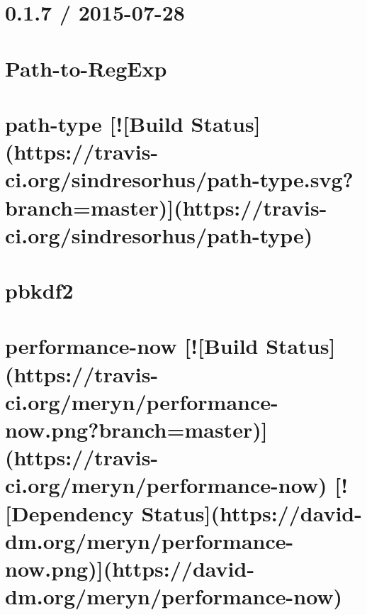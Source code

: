 \documentclass[twoside]{book}
\newcommand{\+}{\discretionary{\mbox{\scriptsize$\hookleftarrow$}}{}{}}
\begin{document}
\chapter{0.1.7 / 2015-\/07-\/28}
\label{md__c_1_workspace_demo_src_main_script_node_modules_path-to-regexp__history}

\chapter{Path-\/to-\/\+Reg\+Exp}
\label{md__c_1_workspace_demo_src_main_script_node_modules_path-to-regexp__readme}

\chapter{path-\/type \mbox{[}!\mbox{[}Build Status\mbox{]}(https\+://travis-\/ci.org/sindresorhus/path-\/type.svg?branch=master)\mbox{]}(https\+://travis-\/ci.org/sindresorhus/path-\/type)}
\label{md__c_1_workspace_demo_src_main_script_node_modules_path-type_readme}

\chapter{pbkdf2}
\label{md__c_1_workspace_demo_src_main_script_node_modules_pbkdf2__r_e_a_d_m_e}

\chapter{performance-\/now \mbox{[}!\mbox{[}Build Status\mbox{]}(https\+://travis-\/ci.org/meryn/performance-\/now.png?branch=master)\mbox{]}(https\+://travis-\/ci.org/meryn/performance-\/now) \mbox{[}!\mbox{[}Dependency Status\mbox{]}(https\+://david-\/dm.org/meryn/performance-\/now.png)\mbox{]}(https\+://david-\/dm.org/meryn/performance-\/now)}
\label{md__c_1_workspace_demo_src_main_script_node_modules_performance-now__r_e_a_d_m_e}

\end{document}
